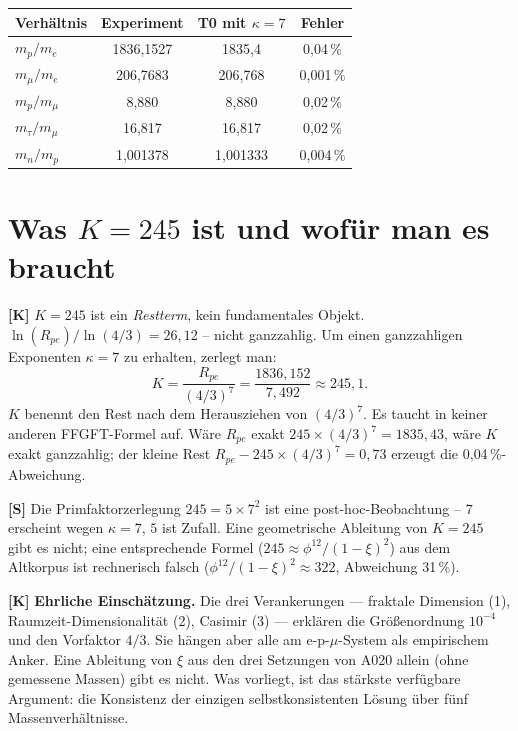\begin{center}
\renewcommand{\arraystretch}{1.3}
{\small
\begin{tabular}{lccc}
\toprule
Verhältnis & Experiment & T0 mit $\kappa=7$ & Fehler \\
\midrule
$m_p/m_e$       & 1836{,}1527 & 1835{,}4 & 0{,}04\,\% \\
$m_\mu/m_e$     & 206{,}7683  & 206{,}768 & 0{,}001\,\% \\
$m_p/m_\mu$     & 8{,}880     & 8{,}880 & 0{,}02\,\% \\
$m_\tau/m_\mu$  & 16{,}817    & 16{,}817 & 0{,}02\,\% \\
$m_n/m_p$       & 1{,}001378  & 1{,}001333 & 0{,}004\,\% \\
\bottomrule
\end{tabular}
}
\renewcommand{\arraystretch}{1.0}
\end{center}

\section{Was $K = 245$ ist und wofür man es braucht}

\textbf{[K]} $K=245$ ist ein \emph{Restterm}, kein fundamentales Objekt.
$\ln(R_{pe})/\ln(4/3) = 26{,}12$ -- nicht ganzzahlig. Um einen ganzzahligen
Exponenten $\kappa=7$ zu erhalten, zerlegt man:
\[
  K = \frac{R_{pe}}{(4/3)^7}
  = \frac{1836{,}152}{7{,}492} \approx 245{,}1.
\]
$K$ benennt den Rest nach dem Herausziehen von $(4/3)^7$. Es taucht in keiner
anderen FFGFT-Formel auf. Wäre $R_{pe}$ exakt $245\times(4/3)^7=1835{,}43$,
wäre $K$ exakt ganzzahlig; der kleine Rest $R_{pe}-245\times(4/3)^7=0{,}73$
erzeugt die 0{,}04\,\%-Abweichung.

\textbf{[S]} Die Primfaktorzerlegung $245=5\times7^2$ ist eine
post-hoc-Beobachtung -- $7$ erscheint wegen $\kappa=7$, $5$ ist Zufall.
Eine geometrische Ableitung von $K=245$ gibt es nicht; eine entsprechende
Formel ($245\approx\phi^{12}/(1-\xi)^2$) aus dem Altkorpus ist rechnerisch
falsch ($\phi^{12}/(1-\xi)^2\approx322$, Abweichung 31\,\%).

\textbf{[K]} \textbf{Ehrliche Einschätzung.} Die drei Verankerungen —
fraktale Dimension (1), Raumzeit-Dimensionalität (2), Casimir (3) — erklären
die Größenordnung $10^{-4}$ und den Vorfaktor $4/3$. Sie hängen aber alle am
e-p-$\mu$-System als empirischem Anker. Eine Ableitung von $\xi$ aus den drei
Setzungen von A020 allein (ohne gemessene Massen) gibt es nicht. Was vorliegt,
ist das stärkste verfügbare Argument: die Konsistenz der einzigen selbstkonsistenten
Lösung über fünf Massenverhältnisse.

